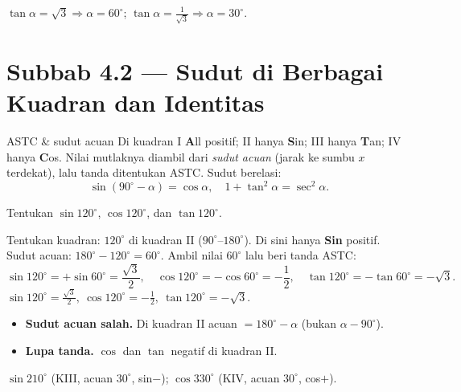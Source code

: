 \begin{variasi}
$\tan\alpha=\sqrt3\Rightarrow\alpha=60^\circ$; $\tan\alpha=\frac{1}{\sqrt3}
\Rightarrow\alpha=30^\circ$.
\end{variasi}

\section*{Subbab 4.2 — Sudut di Berbagai Kuadran dan Identitas}

\begin{ingat}{ASTC \& sudut acuan}
Di kuadran I \textbf{A}ll positif; II hanya \textbf{S}in; III hanya \textbf{T}an;
IV hanya \textbf{C}os. Nilai mutlaknya diambil dari \emph{sudut acuan} (jarak ke
sumbu $x$ terdekat), lalu tanda ditentukan ASTC. Sudut berelasi:
\[
\sin(90^\circ-\alpha)=\cos\alpha,\quad 1+\tan^2\alpha=\sec^2\alpha.
\]
\end{ingat}

\begin{soalbox}{}
Tentukan $\sin120^\circ$, $\cos120^\circ$, dan $\tan120^\circ$.
\end{soalbox}

\jawab
{} Tentukan kuadran: $120^\circ$ di kuadran II ($90^\circ$--$180^\circ$).
Di sini hanya \textbf{Sin} positif.
 Sudut acuan: $180^\circ-120^\circ=60^\circ$.
 Ambil nilai $60^\circ$ lalu beri tanda ASTC:
\[
\sin120^\circ=+\sin60^\circ=\frac{\sqrt3}{2},\quad
\cos120^\circ=-\cos60^\circ=-\frac12,\quad
\tan120^\circ=-\tan60^\circ=-\sqrt3.
\]
\jadi $\sin120^\circ=\frac{\sqrt3}{2},\ \cos120^\circ=-\frac12,\ \tan120^\circ=-\sqrt3$.

\begin{jebakan}
\begin{itemize}[leftmargin=*,topsep=2pt]
  \item \textbf{Sudut acuan salah.} Di kuadran II acuan $=180^\circ-\alpha$
  (bukan $\alpha-90^\circ$).
  \item \textbf{Lupa tanda.} $\cos$ dan $\tan$ negatif di kuadran II.
\end{itemize}
\end{jebakan}

\begin{variasi}
$\sin210^\circ$ (KIII, acuan $30^\circ$, sin$-$); $\cos330^\circ$ (KIV, acuan
$30^\circ$, cos$+$).
\end{variasi}

